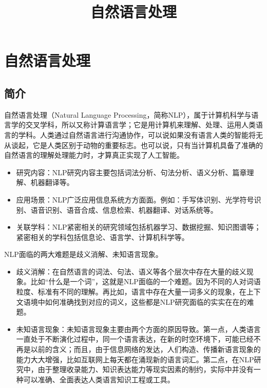 \documentclass[graybox,envcountchap,sectrefs]{svmono}
\begin{document}
\title{自然语言处理}
\maketitle


\frontmatter%

%
%
%
%

\tableofcontents

%

\mainmatter%

\chapter{自然语言处理}
\label{basic} %


\section{简介}
自然语言处理（Natural Language Processing，简称NLP），属于计算机科学与语言学的交叉学科，所以又称计算语言学；它是用计算机来理解、处理、运用人类语言的学科。人类通过自然语言进行沟通协作，可以说如果没有语言人类的智能将无从谈起，它是人类区别于动物的重要标志。也可以说，只有当计算机具备了准确的自然语言的理解处理能力时，才算真正实现了人工智能。
\begin{itemize}
\item 研究内容：NLP研究内容主要包括词法分析、句法分析、语义分析、篇章理解、机器翻译等。
\item 应用场景：NLP广泛应用信息系统方方面面。例如：手写体识别、光学符号识别、语音识别、语音合成、信息检索、机器翻译、对话系统等。
\item 关联学科：NLP紧密相关的研究领域包括机器学习、数据挖掘、知识图谱等；紧密相关的学科包括信息论、语言学、计算机科学等。
\end{itemize}

NLP面临的两大难题是歧义消解、未知语言现象。
\begin{itemize}
\item 歧义消解：在自然语言的词法、句法、语义等各个层次中存在大量的歧义现象。比如“什么是一个词”，这就是NLP面临的一个难题。因为不同的人对词语粒度、标准有不同的理解。再比如，语言中存在大量一词多义的现象，在上下文语境中如何准确找到对应的词义，这些都是NLP研究面临的实实在在的难题。
\item 未知语言现象：未知语言现象主要由两个方面的原因导致。第一点，人类语言一直处于不断演化过程中，同一个语言表达，在新的时空环境下，可能已经不再是以前的含义；而且，由于信息网络的发达，人们构造、传播新语言现象的能力大大增强，比如互联网上每天都在涌现新的语言词汇。第二点，在NLP研究中，由于整理收录能力、知识表达能力等现实因素的制约，实际中并没有一种可以准确、全面表达人类语言知识工程或工具。
\end{itemize}
\end{document}
